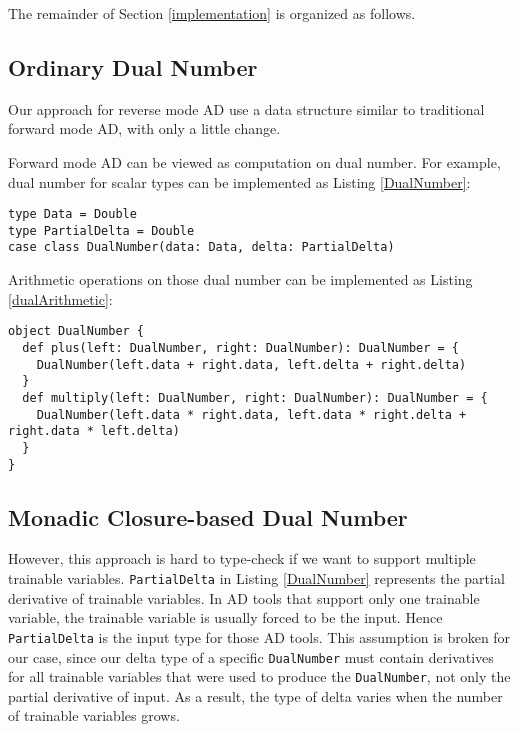 The remainder of Section \ref{implementation} is organized as follows.

\subsection{Ordinary Dual Number}

Our approach for reverse mode AD use a data structure similar to traditional forward mode AD, with only a little change.

Forward mode AD can be viewed as computation on dual number. For example, dual number for scalar types can be implemented as Listing \ref{DualNumber}:

\begin{lstlisting}[float={htbp},caption={Dual number for forward mode AD}, label={DualNumber}]
type Data = Double
type PartialDelta = Double
case class DualNumber(data: Data, delta: PartialDelta)
\end{lstlisting}

Arithmetic operations on those dual number can be implemented as Listing \ref{dualArithmetic}:

\begin{lstlisting}[float={htbp},caption={Arithmetic operations on dual number}, label={dualArithmetic}]
object DualNumber {
  def plus(left: DualNumber, right: DualNumber): DualNumber = {
    DualNumber(left.data + right.data, left.delta + right.delta)
  }
  def multiply(left: DualNumber, right: DualNumber): DualNumber = {
    DualNumber(left.data * right.data, left.data * right.delta + right.data * left.delta)
  }
}
\end{lstlisting}

\subsection{Monadic Closure-based Dual Number}

However, this approach is hard to type-check if we want to support multiple  \glspl{trainable variable}. \lstinline{PartialDelta} in Listing \ref{DualNumber} represents the partial derivative of \glspl{trainable variable}. In AD tools that support only one \gls{trainable variable}, the \gls{trainable variable} is usually forced to be the input. Hence \lstinline{PartialDelta} is the input type for those AD tools. This assumption is broken for our case, since our delta type of a specific \lstinline{DualNumber} must contain derivatives for all \glspl{trainable variable} that were used to produce the \lstinline{DualNumber}, not only the partial derivative of input. As a result, the type of delta varies when the number of \glspl{trainable variable} grows.

